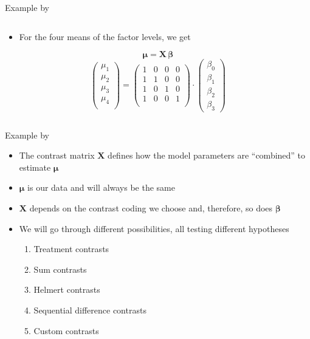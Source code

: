 \documentclass[aspectratio=169]{beamer}
\newcommand{\mat}[1]{\mathbf{#1}}
\newcommand{\gvect}[1]{\boldsymbol{#1}}
\begin{document}
\begin{frame}{Example by \citet{Schad2020}}
\begin{columns}
\begin{column}[t]{.5\textwidth}
  \begin{itemize}
    \item For the four means of the factor levels, we get
  \end{itemize}
\[
  \boldsymbol{\mu} = \mat{X} \, \gvect{\beta}
\]
\[
  \begin{pmatrix}
    \mu_1 \\
    \mu_2 \\
    \mu_3 \\
    \mu_4 \\
  \end{pmatrix} = 
  \begin{pmatrix}
    1 & 0 & 0 & 0 \\ 
    1 & 1 & 0 & 0 \\ 
    1 & 0 & 1 & 0 \\ 
    1 & 0 & 0 & 1 \\ 
  \end{pmatrix} \cdot
  \begin{pmatrix}
    \beta_0 \\
    \beta_1 \\
    \beta_2 \\
    \beta_3
  \end{pmatrix}
\]
    \end{column}
  \end{columns}
\end{frame}

\begin{frame}[<+->]{Example by \citet{Schad2020}}
  \begin{itemize}
    \item The contrast matrix $\mat{X}$ defines how the model parameters
      are ``combined'' to estimate $\boldsymbol{\mu}$
    \item $\boldsymbol{\mu}$ is our data and will always be the same
    \item $\mat{X}$ depends on the contrast coding we choose and, therefore, so
      does $\boldsymbol{\beta}$
    \item We will go through different possibilities, all testing different
      hypotheses
      \begin{enumerate}
        \item Treatment contrasts
        \item Sum contrasts
        \item Helmert contrasts
        \item Sequential difference contrasts
        \item Custom contrasts
      \end{enumerate}
  \end{itemize}
\end{frame}
\end{document}
